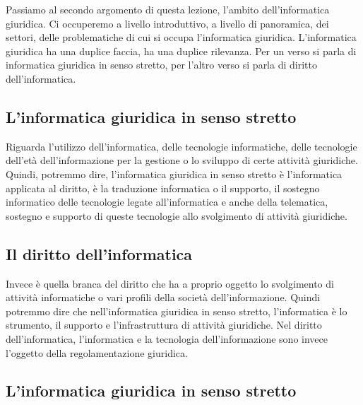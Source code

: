 Passiamo al secondo argomento di questa lezione, l'ambito dell'informatica giuridica. Ci occuperemo a livello introduttivo, a livello di panoramica, dei settori, delle problematiche di cui si occupa l'informatica giuridica. L'informatica giuridica ha una duplice faccia, ha una duplice rilevanza. Per un verso si parla di informatica giuridica in senso stretto, per l'altro verso si parla di diritto dell'informatica. 
\subsection{L'informatica giuridica in senso stretto} 
Riguarda l'utilizzo dell'informatica, delle tecnologie informatiche, delle tecnologie dell'età dell'informazione per la gestione o lo sviluppo di certe attività giuridiche. Quindi, potremmo dire, l'informatica giuridica in senso stretto è l'informatica applicata al diritto, è la traduzione informatica o il supporto, il sostegno informatico delle tecnologie legate all'informatica e anche della telematica, sostegno e supporto di queste tecnologie allo svolgimento di attività giuridiche. 
\subsection{Il diritto dell'informatica} 
Invece è quella branca del diritto che ha a proprio oggetto lo svolgimento di attività informatiche o vari profili della società dell'informazione. Quindi potremmo dire che nell'informatica giuridica in senso stretto, l'informatica è lo strumento, il supporto e l'infrastruttura di attività giuridiche. 
Nel diritto dell'informatica, l'informatica e la tecnologia dell'informazione sono invece l'oggetto della regolamentazione giuridica. 
\subsection{L'informatica giuridica in senso stretto} 

